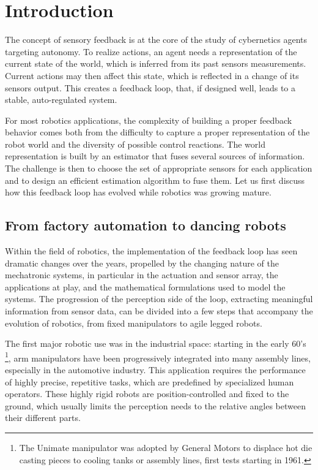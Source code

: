 \chapter{Introduction}



The concept of sensory feedback is at the core of the study of cybernetics agents targeting autonomy. To realize
actions, an agent needs a representation of the current state of the world, which is inferred from its past sensors measurements. Current actions may 
then affect this state, which is reflected in a change of its sensors output. This creates a feedback loop, that, if designed well, leads to a stable, 
auto-regulated system.

For most robotics applications, the complexity of building a proper feedback behavior comes both from the difficulty
to capture a proper representation of the robot world and the diversity of possible control reactions. 
The world representation is built by an estimator that fuses several sources of information. 
The challenge is then to choose the set of appropriate sensors for each application and to design an efficient estimation algorithm to fuse them.
Let us first discuss how this feedback loop has evolved while robotics was growing mature.




\section{From factory automation to dancing robots}

Within the field of robotics, the implementation of the feedback loop has seen dramatic changes over the years, propelled by the changing nature 
of the mechatronic systems, in particular in the actuation and sensor array, the applications at play, and the mathematical formulations
used to model the systems. The progression of the perception side of the loop, extracting meaningful information from sensor data, can be divided into a few
steps that accompany the evolution of robotics, from fixed manipulators to agile legged robots. 

The first major robotic use was in the industrial space: 
starting in the early 60's \footnote{The Unimate manipulator was adopted by General Motors to displace hot die casting pieces to cooling tanks or assembly lines, first tests starting in 1961.}, 
arm manipulators have been progressively integrated into many assembly lines, especially in the automotive industry. 
This application requires the performance of highly precise, repetitive tasks, which are predefined by specialized human operators.
These highly rigid robots are position-controlled and fixed to the ground, which usually limits the perception needs to the relative angles between their different parts.

